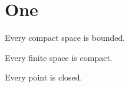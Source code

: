 \documentclass{article}
\begin{document}
\section{One}
\begin{lemma} Every compact space is bounded. \end{lemma}
\begin{theorem} Every finite space is compact. \end{theorem}
\begin{lemma} Every point is closed. \end{lemma}
\end{document}

